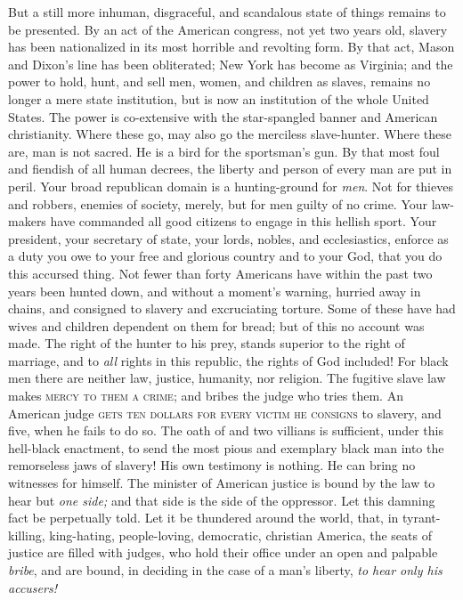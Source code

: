 But a still more inhuman, disgraceful, and scandalous state of things
remains to be presented. By an act of the American congress, not yet two
years old, slavery has been nationalized in its
{\protect\hypertarget{449}{}{}}most horrible and revolting form. By that
act, Mason and Dixon's line has been obliterated; New York has become as
Virginia; and the power to hold, hunt, and sell men, women, and children
as slaves, remains no longer a mere state institution, but is now an
institution of the whole United States. The power is co-extensive with
the star-spangled banner and American christianity. Where these go, may
also go the merciless slave-hunter. Where these are, man is not sacred.
He is a bird for the sportsman's gun. By that most foul and fiendish of
all human decrees, the liberty and person of every man are put in peril.
Your broad republican domain is a hunting-ground for \emph{men}. Not for
thieves and robbers, enemies of society, merely, but for men guilty of
no crime. Your law-makers have commanded all good citizens to engage in
this hellish sport. Your president, your secretary of state, your lords,
nobles, and ecclesiastics, enforce as a duty you owe to your free and
glorious country and to your God, that you do this accursed thing. Not
fewer than forty Americans have within the past two years been hunted
down, and without a moment's warning, hurried away in chains, and
consigned to slavery and excruciating torture. Some of these have had
wives and children dependent on them for bread; but of this no account
was made. The right of the hunter to his prey, stands superior to the
right of marriage, and to \emph{all} rights in this republic, the rights
of God included! For black men there are neither law, justice, humanity,
nor religion. The fugitive slave law makes \textsc{mercy to them a
crime}; and bribes the judge who tries them. An American judge
\textsc{gets ten dollars for every victim he consigns} to slavery, and
five, when he fails to do so. The oath of {and} two villians is
sufficient, under this hell-black enactment, to send the most pious and
exemplary black man into the remorseless jaws of slavery! His own
testimony is nothing. He can bring no witnesses for himself. The
minister of American justice is bound by the law to hear but \emph{one
side;} and that side is the side of the oppressor. Let this damning fact
be perpetually told. Let it be thundered around the world, that, in
tyrant-killing, king-hating, people-loving, democratic, christian
America, the seats of justice are filled with judges, who hold their
office under an open and palpable \emph{bribe}, and are bound, in
deciding in the case of a man's liberty, \emph{to hear only his
accusers!}

